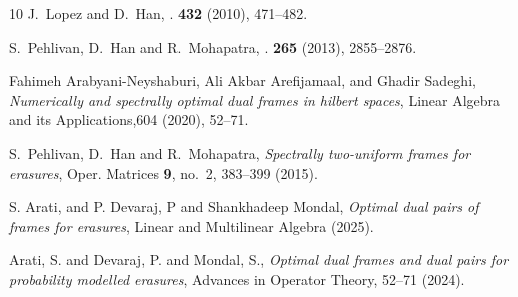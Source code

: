 \documentclass[final,1p,times]{elsarticle}
\begin{document}
\begin{thebibliography}{10}
J.~Lopez and D.~Han,
.
 \textbf{432} (2010), 471--482.

S.~Pehlivan, D.~Han and R.~Mohapatra,
.
 \textbf{265} (2013), 2855--2876.

Fahimeh Arabyani-Neyshaburi, Ali Akbar Arefijamaal, and Ghadir Sadeghi, \emph{Numerically and spectrally optimal dual frames in hilbert spaces}, Linear Algebra and its Applications,604 (2020), 52–71.

S.~Pehlivan, D.~Han and R.~Mohapatra, \emph{Spectrally two-uniform
  frames for erasures}, Oper. Matrices \textbf{9}, no.~2, 383--399 (2015).


S. Arati,  and P. Devaraj, P and Shankhadeep Mondal, \emph{Optimal dual pairs of frames for erasures}, Linear and Multilinear Algebra (2025).

Arati, S. and Devaraj, P. and Mondal, S., \emph{Optimal dual frames and dual pairs for probability modelled erasures}, Advances in Operator Theory, 52--71 (2024).

\end{thebibliography}

	
		

		
\end{document}
